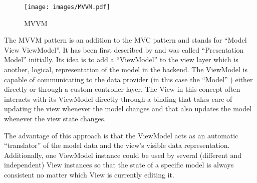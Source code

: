 \begin{figure}[htb]
  \centerline{\texttt{[image: images/MVVM.pdf]}}
  \caption[MVVM]{MVVM}
  \label{fig:mvvm}
\end{figure}

The MVVM pattern is an addition to the MVC pattern and stands for ``Model View ViewModel''. It has been first described by \cite{fowler04mvvm} and was called ``Presentation Model'' initially. Its idea is to add a ``ViewModel'' to the view layer which is another, logical, representation of the model in the backend. The ViewModel is capable of communicating to the data provider (in this case the ``Model'' ) either directly or through a custom controller layer. The View in this concept often interacts with its ViewModel directly through a binding that takes care of updating the view whenever the model changes and that also updates the model whenever the view state changes.

The advantage of this approach is that the ViewModel acts as an automatic ``translator'' of the model data and the view's visible data representation. Additionally, one ViewModel instance could be used by several (different and independent) View instances so that the state of a specific model is always consistent no matter which View is currently editing it.